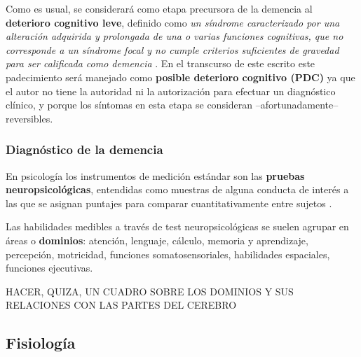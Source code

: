 Como es usual, se considerará como etapa precursora de la demencia al
\textbf{deterioro cognitivo leve}, definido como \textit{un
síndrome caracterizado por una alteración adquirida y prolongada de una o varias funciones 
cognitivas, que no corresponde a un síndrome focal y no cumple criterios suficientes de 
gravedad para ser calificada como demencia} \cite{Robles02}.
En el transcurso de este escrito este padecimiento
será manejado como \textbf{posible deterioro cognitivo (PDC)} ya
que el autor no tiene la autoridad ni la autorización para efectuar un diagnóstico clínico, y 
porque los síntomas en esta etapa se consideran --afortunadamente-- reversibles.


\subsubsection{Diagnóstico de la demencia}

En psicología los instrumentos de medición estándar son las \textbf{pruebas neuropsicológicas}, 
entendidas como muestras
de alguna conducta de interés a las que se asignan puntajes para comparar cuantitativamente
entre sujetos \cite{Ardila12}.

Las habilidades medibles a través de test neuropsicológicas se suelen agrupar en áreas o
\textbf{dominios}: atención, lenguaje, cálculo, memoria y aprendizaje, percepción,
motricidad, funciones somatosensoriales, habilidades espaciales, funciones ejecutivas. 

HACER, QUIZA, UN CUADRO SOBRE LOS DOMINIOS Y SUS RELACIONES CON LAS PARTES DEL CEREBRO

\subsection{Fisiología}


